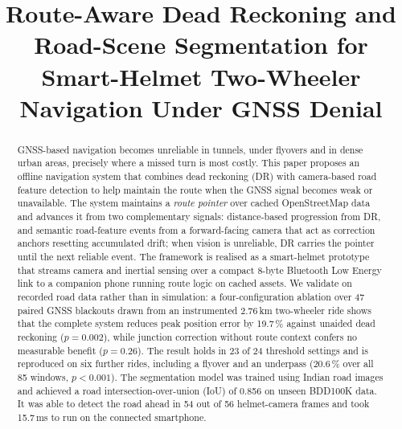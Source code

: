 \documentclass[conference]{IEEEtran}
\begin{document}
\title{Route-Aware Dead Reckoning and Road-Scene Segmentation for Smart-Helmet Two-Wheeler Navigation Under GNSS Denial}

\author{
\and
{}
}

\maketitle
\thispagestyle{firstpage}

\begin{abstract}
GNSS-based navigation becomes unreliable in tunnels, under flyovers and in dense urban areas, precisely where a missed turn is most costly. This paper proposes an offline navigation system that combines dead reckoning (DR) with camera-based road feature detection to help maintain the route when the GNSS signal becomes weak or unavailable. The system maintains a \emph{route pointer} over cached OpenStreetMap data and advances it from two complementary signals: distance-based progression from DR, and semantic road-feature events from a forward-facing camera that act as correction anchors resetting accumulated drift; when vision is unreliable, DR carries the pointer until the next reliable event. The framework is realised as a smart-helmet prototype that streams camera and inertial sensing over a compact 8-byte Bluetooth Low Energy link to a companion phone running route logic on cached assets. We validate on recorded road data rather than in simulation: a four-configuration ablation over 47 paired GNSS blackouts drawn from an instrumented 2.76\,km two-wheeler ride shows that the complete system reduces peak position error by 19.7\,\% against unaided dead reckoning ($p{=}0.002$), while junction correction without route context confers no measurable benefit ($p{=}0.26$). The result holds in 23 of 24 threshold settings and is reproduced on six further rides, including a flyover and an underpass (20.6\,\% over all 85 windows, $p{<}0.001$). The segmentation model was trained using Indian road images and achieved a road intersection-over-union (IoU) of 0.856 on unseen BDD100K data. It was able to detect the road ahead in 54 out of 56 helmet-camera frames and took 15.7\,ms to run on the connected smartphone.
\end{abstract}
\end{document}
